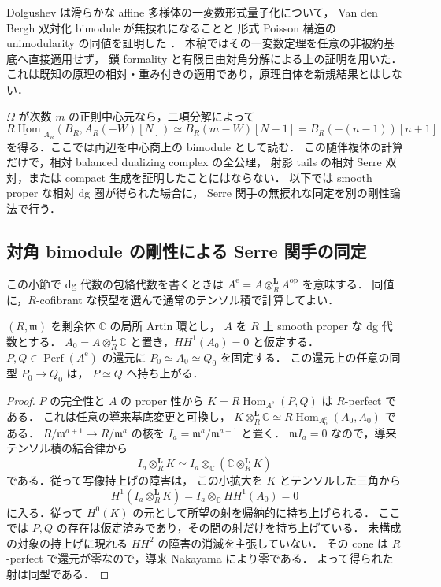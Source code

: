 \begin{remark}
Dolgushev は滑らかな affine 多様体の一変数形式量子化について，
Van den Bergh 双対化 bimodule が無捩れになることと
形式 Poisson 構造の unimodularity の同値を証明した
\cite[Theorem~3]{DolgushevModular2009}．
本稿ではその一変数定理を任意の非被約基底へ直接適用せず，
鎖 formality と有限自由対角分解による上の証明を用いた．
これは既知の原理の相対・重み付きの適用であり，原理自体を新規結果とはしない．

$\Omega$ が次数 $m$ の正則中心元なら，二項分解によって
\[
 \underline{R\operatorname{Hom}}_{A_R}
 (B_R,A_R(-W)[N])\simeq B_R(m-W)[N-1]
 =B_R(-(n-1))[n+1]
\]
を得る．ここでは両辺を中心商上の bimodule として読む．
この随伴複体の計算だけで，相対 balanced dualizing complex の全公理，
射影 tails の相対 Serre 双対，または compact 生成を証明したことにはならない．
以下では smooth proper な相対 dg 圏が得られた場合に，
Serre 関手の無捩れな同定を別の剛性論法で行う．
\end{remark}

\subsection{対角 bimodule の剛性による Serre 関手の同定}

この小節で dg 代数の包絡代数を書くときは
$A^{\mathrm e}=A\otimes_R^{\mathbf L}A^{\mathrm{op}}$ を意味する．
同値に，$R$-cofibrant な模型を選んで通常のテンソル積で計算してよい．

\begin{lemma}[対角の二つの持上げの同型]
\label{lem:diagonal-bimodule-rigidity}
$(R,\mathfrak m)$ を剰余体 $\mathbb C$ の局所 Artin 環とし，
$A$ を $R$ 上 smooth proper な dg 代数とする．
$A_0=A\otimes_R^{\mathbf L}\mathbb C$ と置き，$HH^1(A_0)=0$ と仮定する．
$P,Q\in\operatorname{Perf}(A^{\mathrm e})$ の還元に
$P_0\simeq A_0\simeq Q_0$ を固定する．
この還元上の任意の同型 $P_0\to Q_0$ は，
$P\simeq Q$ へ持ち上がる．
\end{lemma}
\begin{proof}
$P$ の完全性と $A$ の proper 性から
$K=R\operatorname{Hom}_{A^{\mathrm e}}(P,Q)$ は $R$-perfect である．
これは任意の導来基底変更と可換し，
$K\otimes_R^{\mathbf L}\mathbb C\simeq
 R\operatorname{Hom}_{A_0^{\mathrm e}}(A_0,A_0)$ である．
$R/\mathfrak m^{a+1}\to R/\mathfrak m^a$ の核を
$I_a=\mathfrak m^a/\mathfrak m^{a+1}$ と置く．
$\mathfrak m I_a=0$ なので，導来テンソル積の結合律から
\[
 I_a\otimes_R^{\mathbf L}K
 \simeq I_a\otimes_{\mathbb C}
       (\mathbb C\otimes_R^{\mathbf L}K)
\]
である．従って写像持上げの障害は，
この小拡大を $K$ とテンソルした三角から
\[
 H^1(I_a\otimes_R^{\mathbf L}K)
 =I_a\otimes_{\mathbb C}HH^1(A_0)=0
\]
に入る．従って $H^0(K)$ の元として所望の射を帰納的に持ち上げられる．
ここでは $P,Q$ の存在は仮定済みであり，その間の射だけを持ち上げている．
未構成の対象の持上げに現れる $HH^2$ の障害の消滅を主張していない．
その cone は $R$-perfect で還元が零なので，導来 Nakayama により零である．
よって得られた射は同型である．
\end{proof}


